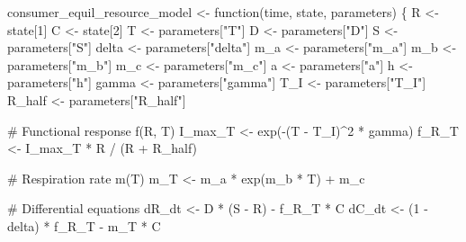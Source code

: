 \documentclass[
  letterpaper,
  DIV=11,
  numbers=noendperiod]{scrartcl}
\newenvironment{Shaded}{\begin{snugshade}}{\end{snugshade}}
\newcommand{\CommentTok}[1]{\textcolor[rgb]{0.37,0.37,0.37}{#1}}
\newcommand{\ControlFlowTok}[1]{\textcolor[rgb]{0.00,0.23,0.31}{#1}}
\newcommand{\DecValTok}[1]{\textcolor[rgb]{0.68,0.00,0.00}{#1}}
\newcommand{\FunctionTok}[1]{\textcolor[rgb]{0.28,0.35,0.67}{#1}}
\newcommand{\NormalTok}[1]{\textcolor[rgb]{0.00,0.23,0.31}{#1}}
\newcommand{\OtherTok}[1]{\textcolor[rgb]{0.00,0.23,0.31}{#1}}
\newcommand{\SpecialCharTok}[1]{\textcolor[rgb]{0.37,0.37,0.37}{#1}}
\newcommand{\StringTok}[1]{\textcolor[rgb]{0.13,0.47,0.30}{#1}}
\begin{document}
\begin{Shaded}
\begin{Highlighting}[]
\NormalTok{consumer\_equil\_resource\_model }\OtherTok{\textless{}{-}} \ControlFlowTok{function}\NormalTok{(time, state, parameters) \{}
\NormalTok{    R }\OtherTok{\textless{}{-}}\NormalTok{ state[}\DecValTok{1}\NormalTok{]}
\NormalTok{    C }\OtherTok{\textless{}{-}}\NormalTok{ state[}\DecValTok{2}\NormalTok{]}
\NormalTok{    T }\OtherTok{\textless{}{-}}\NormalTok{ parameters[}\StringTok{"T"}\NormalTok{]}
\NormalTok{    D }\OtherTok{\textless{}{-}}\NormalTok{ parameters[}\StringTok{"D"}\NormalTok{]}
\NormalTok{    S }\OtherTok{\textless{}{-}}\NormalTok{ parameters[}\StringTok{"S"}\NormalTok{]}
\NormalTok{    delta }\OtherTok{\textless{}{-}}\NormalTok{ parameters[}\StringTok{"delta"}\NormalTok{]}
\NormalTok{    m\_a }\OtherTok{\textless{}{-}}\NormalTok{ parameters[}\StringTok{"m\_a"}\NormalTok{]}
\NormalTok{    m\_b }\OtherTok{\textless{}{-}}\NormalTok{ parameters[}\StringTok{"m\_b"}\NormalTok{]}
\NormalTok{    m\_c }\OtherTok{\textless{}{-}}\NormalTok{ parameters[}\StringTok{"m\_c"}\NormalTok{]}
\NormalTok{    a }\OtherTok{\textless{}{-}}\NormalTok{ parameters[}\StringTok{"a"}\NormalTok{]}
\NormalTok{    h }\OtherTok{\textless{}{-}}\NormalTok{ parameters[}\StringTok{"h"}\NormalTok{]}
\NormalTok{    gamma }\OtherTok{\textless{}{-}}\NormalTok{ parameters[}\StringTok{"gamma"}\NormalTok{]}
\NormalTok{    T\_I }\OtherTok{\textless{}{-}}\NormalTok{ parameters[}\StringTok{"T\_I"}\NormalTok{]}
\NormalTok{    R\_half }\OtherTok{\textless{}{-}}\NormalTok{ parameters[}\StringTok{"R\_half"}\NormalTok{]}

    \CommentTok{\# Functional response f(R, T)}
\NormalTok{    I\_max\_T }\OtherTok{\textless{}{-}} \FunctionTok{exp}\NormalTok{(}\SpecialCharTok{{-}}\NormalTok{(T }\SpecialCharTok{{-}}\NormalTok{ T\_I)}\SpecialCharTok{\^{}}\DecValTok{2} \SpecialCharTok{*}\NormalTok{ gamma)}
\NormalTok{    f\_R\_T }\OtherTok{\textless{}{-}}\NormalTok{ I\_max\_T }\SpecialCharTok{*}\NormalTok{ R }\SpecialCharTok{/}\NormalTok{ (R }\SpecialCharTok{+}\NormalTok{ R\_half)}

    \CommentTok{\# Respiration rate m(T)}
\NormalTok{    m\_T }\OtherTok{\textless{}{-}}\NormalTok{ m\_a }\SpecialCharTok{*} \FunctionTok{exp}\NormalTok{(m\_b }\SpecialCharTok{*}\NormalTok{ T) }\SpecialCharTok{+}\NormalTok{ m\_c}

    \CommentTok{\# Differential equations}
\NormalTok{    dR\_dt }\OtherTok{\textless{}{-}}\NormalTok{ D }\SpecialCharTok{*}\NormalTok{ (S }\SpecialCharTok{{-}}\NormalTok{ R) }\SpecialCharTok{{-}}\NormalTok{ f\_R\_T }\SpecialCharTok{*}\NormalTok{ C}
\NormalTok{    dC\_dt }\OtherTok{\textless{}{-}}\NormalTok{ (}\DecValTok{1} \SpecialCharTok{{-}}\NormalTok{ delta) }\SpecialCharTok{*}\NormalTok{ f\_R\_T }\SpecialCharTok{{-}}\NormalTok{ m\_T }\SpecialCharTok{*}\NormalTok{ C}


\end{Highlighting}
\end{Shaded}
\end{document}
